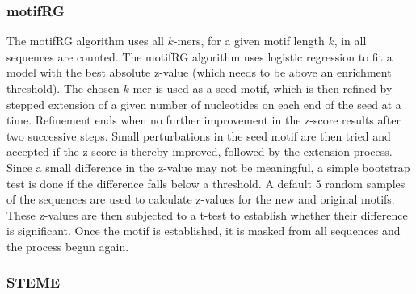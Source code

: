 \documentclass[12pt, onecolumn, oneside]{gsajnl}
\begin{document}
\subsubsection{motifRG\;\;}

The motifRG algorithm \citep{yao2013discriminative} uses all $k$-mers, for a given motif length $k$,  in all sequences are counted. The motifRG algorithm uses logistic regression to fit a model with the best absolute z-value (which needs to be above an enrichment threshold). The chosen $k$-mer is used as a seed motif, which is then refined by stepped extension of a given number of nucleotides on each end of the seed at a time. Refinement ends when no further improvement in the z-score results after two successive steps. Small perturbations in the seed motif are then tried and accepted if the z-score is thereby improved, followed by the extension process. Since a small difference in the z-value may not be meaningful, a simple bootstrap test is done if the difference falls below a threshold. A default 5 random samples of the sequences are used to calculate z-values for the new and original motifs. These z-values are then subjected to a t-test to establish whether their difference is significant.
Once the motif is established, it is masked from all sequences and the process begun again.

\subsubsection{STEME\;\;}
\end{document}
